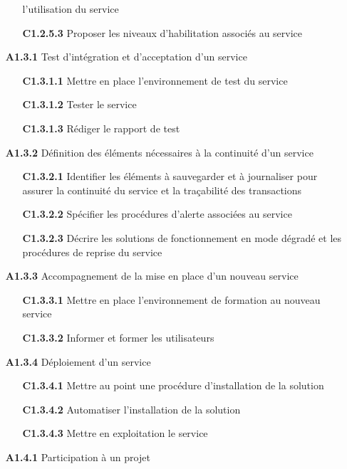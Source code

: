 \documentclass[12pt,a4paper,oneside,titlepage,final]{article}
\begin{document}
\begin{enumerate}
\begin{itemize}
    l'utilisation du service
    \item [\textbf{C1.2.5.3}] Proposer les niveaux d'habilitation
    associés au service
  \end{itemize}
  \item [\textbf{A1.3.1}] Test d'intégration et d'acceptation d'un
  service
  \begin{itemize}
    \item [\textbf{C1.3.1.1}] Mettre en place l'environnement de
    test du service
    \item [\textbf{C1.3.1.2}] Tester le service
    \item [\textbf{C1.3.1.3}] Rédiger le rapport de test
  \end{itemize}
  \item [\textbf{A1.3.2}] Définition des éléments nécessaires à la
  continuité d'un service
  \begin{itemize}
    \item [\textbf{C1.3.2.1}] Identifier les éléments à
    sauvegarder et à journaliser pour assurer la continuité du service
    et la traçabilité des transactions
    \item [\textbf{C1.3.2.2}] Spécifier les procédures d'alerte
    associées au service
    \item [\textbf{C1.3.2.3}] Décrire les solutions de fonctionnement
    en mode dégradé et les procédures de reprise du service
  \end{itemize}
  \item [\textbf{A1.3.3}] Accompagnement de la mise en place d'un
  nouveau service
  \begin{itemize}
    \item [\textbf{C1.3.3.1}] Mettre en place l'environnement de
    formation au nouveau service
    \item [\textbf{C1.3.3.2}] Informer et former les utilisateurs
  \end{itemize}
  \item [\textbf{A1.3.4}] Déploiement d'un service
  \begin{itemize}
    \item [\textbf{C1.3.4.1}] Mettre au point une procédure
    d'installation de la solution
    \item [\textbf{C1.3.4.2}] Automatiser l'installation de la
    solution
    \item [\textbf{C1.3.4.3}] Mettre en exploitation le service
  \end{itemize}
  \item [\textbf{A1.4.1}] Participation à un projet

\end{enumerate}
\end{document}
